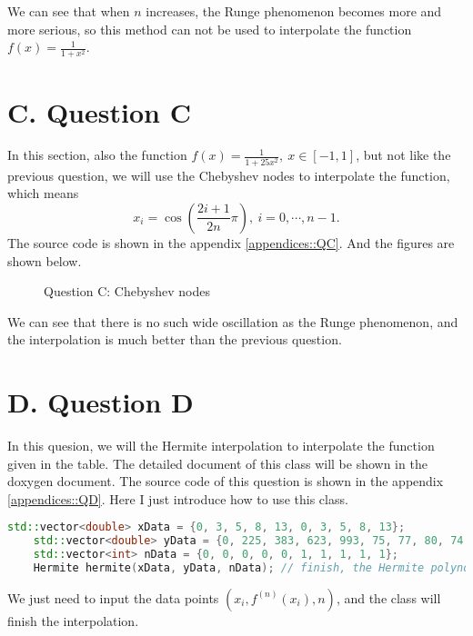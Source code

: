 \documentclass[a4paper]{article}
\begin{document}
We can see that when $n$ increases, the Runge phenomenon becomes more and more serious, so this method can not be used to interpolate the function $f(x) = \frac{1}{1+x^2}$.

\section*{C. Question C}

In this section, also the function $f(x) = \frac{1}{1+25x^2},~x\in[-1,1]$, but not like the previous question, we will use the Chebyshev nodes to interpolate the function, which means
\begin{equation}
	x_i = \cos (\frac{2i+1}{2n}\pi),~i=0,\cdots,n-1.
\end{equation}
The source code is shown in the appendix \ref{appendices::QC}. And the figures are shown below.
\begin{figure}[ht]
    \centering
    \caption{Question C: Chebyshev nodes}
    \label{fig::questionC}
\end{figure}

We can see that there is no such wide oscillation as the Runge phenomenon, and the interpolation is much better than the previous question.


\section*{D. Question D}

In this quesion, we will the Hermite interpolation to interpolate the function given in the table. The detailed document of this class will be shown in the doxygen document. The source code of this question is shown in the appendix \ref{appendices::QD}. Here I just introduce how to use this class.
\begin{lstlisting}[language=C++]
    std::vector<double> xData = {0, 3, 5, 8, 13, 0, 3, 5, 8, 13};
    std::vector<double> yData = {0, 225, 383, 623, 993, 75, 77, 80, 74, 72};
    std::vector<int> nData = {0, 0, 0, 0, 0, 1, 1, 1, 1, 1};
    Hermite hermite(xData, yData, nData); // finish, the Hermite polynomial is stored in hermite.m_poly
\end{lstlisting}
We just need to input the data points $(x_i, f^{(n)}(x_i), n)$, and the class will finish the interpolation.
\end{document}
